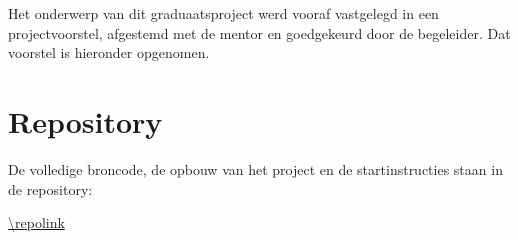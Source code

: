 \documentclass[dutch,dit,report]{hogentreport}
\begin{document}
Het onderwerp van dit graduaatsproject werd vooraf vastgelegd in een
projectvoorstel, afgestemd met de mentor en goedgekeurd door de begeleider.
Dat voorstel is hieronder opgenomen.



\chapter{Repository}

De volledige broncode, de opbouw van het project en de startinstructies staan
in de repository:

\begin{center}
  \url{\repolink}
\end{center}




%


\backmatter{}

\setlength\bibitemsep{2pt}
\printbibliography[heading=bibintoc]
\end{document}
